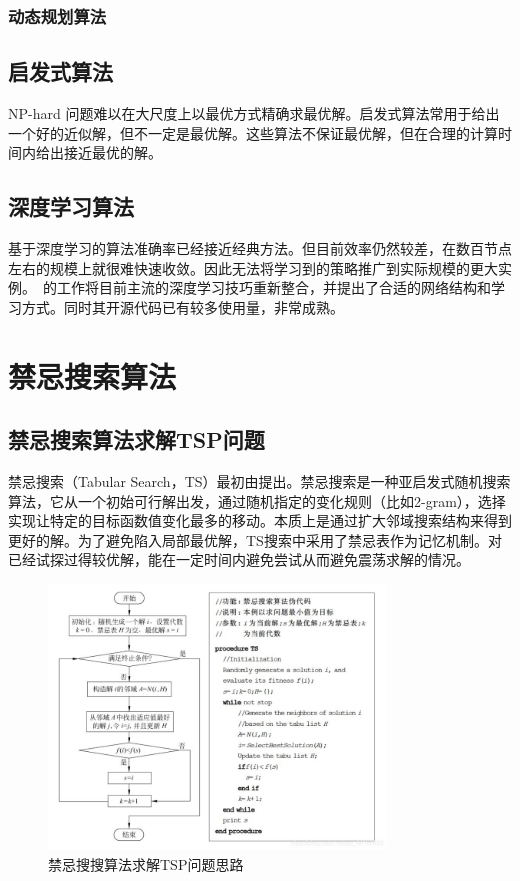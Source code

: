 \documentclass[lang=cn,11pt]{elegantpaper}
\begin{document}
\subsubsection{动态规划算法}

\subsection{启发式算法}
NP-hard 问题难以在大尺度上以最优方式精确求最优解。启发式算法常用于给出一个好的近似解，但不一定是最优解。这些算法不保证最优解，但在合理的计算时间内给出接近最优的解。

\subsection{深度学习算法}
基于深度学习的算法准确率已经接近经典方法。但目前效率仍然较差，在数百节点左右的规模上就很难快速收敛。因此无法将学习到的策略推广到实际规模的更大实例。~\cite{goodDLforTSP}的工作将目前主流的深度学习技巧重新整合，并提出了合适的网络结构和学习方式。同时其开源代码已有较多使用量，非常成熟。



\section{禁忌搜索算法}
\subsection{禁忌搜索算法求解TSP问题}
禁忌搜索（Tabular Search，TS）最初由\cite{tabusearch}提出。禁忌搜索是一种亚启发式随机搜索算法，它从一个初始可行解出发，通过随机指定的变化规则（比如2-gram），选择实现让特定的目标函数值变化最多的移动。本质上是通过扩大邻域搜索结构来得到更好的解。为了避免陷入局部最优解，TS搜索中采用了禁忌表作为记忆机制。对已经试探过得较优解，能在一定时间内避免尝试从而避免震荡求解的情况。


\begin{figure}[h]
  \centering
  \includegraphics[width=0.8\textwidth]{figure/禁忌搜索算法流程.jpg} %
  \caption{禁忌搜搜算法求解TSP问题思路 } %
   \label{tabsearch}
\end{figure}
\end{document}
